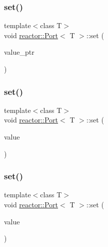 \subsubsection{\texorpdfstring{set()}{set()}\hspace{0.1cm}{\footnotesize\ttfamily [2/4]}}
{\footnotesize\ttfamily template$<$class T$>$ \\
void \hyperlink{classreactor_1_1Port}{reactor\+::\+Port}$<$ T $>$\+::set (\begin{DoxyParamCaption}\item[{\hyperlink{classreactor_1_1MutableValuePtr}{Mutable\+Value\+Ptr}$<$ T $>$ \&\&}]{value\+\_\+ptr }\end{DoxyParamCaption})\hspace{0.3cm}{\ttfamily [inline]}}

\mbox{\label{classreactor_1_1Port_ac75bc82e495f182037d5f7273fc75491}} 
\subsubsection{\texorpdfstring{set()}{set()}\hspace{0.1cm}{\footnotesize\ttfamily [3/4]}}
{\footnotesize\ttfamily template$<$class T$>$ \\
void \hyperlink{classreactor_1_1Port}{reactor\+::\+Port}$<$ T $>$\+::set (\begin{DoxyParamCaption}\item[{const T \&}]{value }\end{DoxyParamCaption})\hspace{0.3cm}{\ttfamily [inline]}}

\mbox{\label{classreactor_1_1Port_a9f742e8839c5061c21f890c1ca5fca6b}} 
\subsubsection{\texorpdfstring{set()}{set()}\hspace{0.1cm}{\footnotesize\ttfamily [4/4]}}
{\footnotesize\ttfamily template$<$class T$>$ \\
void \hyperlink{classreactor_1_1Port}{reactor\+::\+Port}$<$ T $>$\+::set (\begin{DoxyParamCaption}\item[{T \&\&}]{value }\end{DoxyParamCaption})\hspace{0.3cm}{\ttfamily [inline]}}

